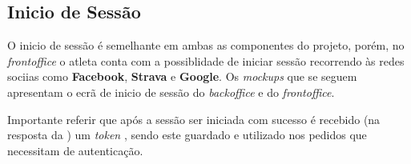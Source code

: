 \subsection{Inicio de Sessão}


O inicio de sessão é semelhante em ambas as componentes do projeto, porém, no \textit{frontoffice} o atleta conta com a possiblidade de iniciar sessão recorrendo às redes sociias como \textbf{Facebook}, \textbf{Strava} e \textbf{Google}. Os \textit{mockups} que se seguem apresentam o ecrã de inicio de sessão do \textit{backoffice} e do \textit{frontoffice}.



Importante referir que após a sessão ser iniciada com sucesso é recebido (na resposta da ) um \textit{token} \textbf{}, sendo este guardado e utilizado nos pedidos que necessitam de autenticação.
